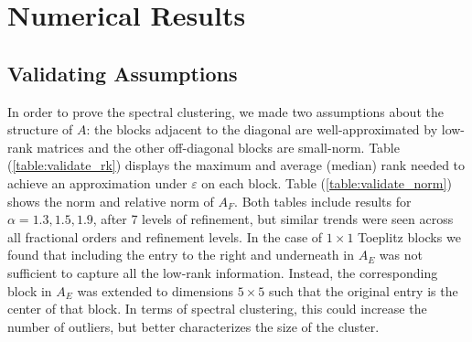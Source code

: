 \documentclass[review]{siamart251216}
\newcommand{\R}{{\mathbb{R}}}
\newcommand{\A}{{A }}
\newcommand{\offd}{{A_E}}
\newcommand{\Tau}{\mathcal{T}}
\newcommand{\ptau}{{\bm{\tau}}}
\begin{document}


\section{Numerical Results}
\subsection{Validating Assumptions}\label{validate}
In order to prove the spectral clustering, we made two assumptions about the structure of $\A$: the blocks adjacent to the diagonal are well-approximated by low-rank matrices and the other off-diagonal blocks are small-norm. Table (\ref{table:validate_rk}) displays the  maximum and average (median) rank needed to achieve an approximation under $\varepsilon$ on each block. Table (\ref{table:validate_norm}) shows the norm and relative norm of $A_F$. Both tables include results for $\alpha = 1.3, 1.5, 1.9$, after 7 levels of refinement, but similar trends were seen across all fractional orders and refinement levels. In the case of $1 \times 1$ Toeplitz blocks we found that including the entry to the right and underneath in $\offd$ was not sufficient to capture all the low-rank information. Instead, the corresponding block in $\offd$ was extended to dimensions $5 \times 5$ such that the original entry is the center of that block. In terms of spectral clustering, this could increase the number of outliers, but better characterizes the size of the cluster. 
\end{document}
